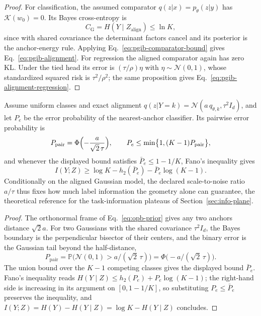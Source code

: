 \begin{proof}
For classification, the assumed comparator $q(z|x)=p_\theta(z|y)$ has
$\mathcal K(w_0)=0$. Its Bayes cross-entropy is
\begin{equation*}
C_{\mathrm G}=H(Y\mid Z_{\mathrm{align}})\le\ln K,
\end{equation*}
since with shared covariance the determinant factors cancel and its posterior is the
anchor-energy rule. Applying Eq.~\eqref{eq:pgib-comparator-bound} gives
Eq.~\eqref{eq:pgib-alignment}. For regression the aligned comparator again has zero
KL. Under the tied head its error is $(\tau/\rho)\eta$ with
$\eta\sim\mathcal N(0,1)$, whose standardized squared risk is $\tau^2/\rho^2$;
the same proposition gives Eq.~\eqref{eq:pgib-alignment-regression}.
\end{proof}

\begin{corollary}
\label{cor:opb-fano}
Assume uniform classes and exact alignment
$q(z|Y=k) = \mathcal{N}(a\,q_{\theta,k}, \tau^2 I_d)$, and let $P_e$ be the error
probability of the nearest-anchor classifier. Its pairwise error probability is
\begin{equation}
P_{\mathrm{pair}} = \Phi\Bigl(-\frac{a}{\sqrt{2}\,\tau}\Bigr),
\qquad
P_e \le \min\bigl\{1, (K-1)P_{\mathrm{pair}}\bigr\},
\end{equation}
and whenever the displayed bound satisfies $\bar P_e \le 1 - 1/K$, Fano's inequality
\citep{cover2006elements}
gives
\begin{equation}
I(Y;Z) \ge \log K - h_2(\bar P_e) - \bar P_e \log(K-1).
\end{equation}
Conditionally on the aligned Gaussian model, the declared scale-to-noise ratio
$a/\tau$ thus fixes how much label information the geometry alone can guarantee,
the theoretical reference for the task-information plateaus of
Section~\ref{sec:info-plane}.
\end{corollary}

\begin{proof}
The orthonormal frame of Eq.~\eqref{eq:opb-prior} gives any two anchors distance $\sqrt2a$. For
two Gaussians with the shared covariance $\tau^2I_d$, the Bayes boundary is the
perpendicular bisector of their centers, and the binary error is the Gaussian tail
beyond the half-distance,
\begin{equation*}
P_{\mathrm{pair}}
=\mathbb P\bigl(\mathcal N(0,1)>a/(\sqrt2\,\tau)\bigr)
=\Phi\bigl(-a/(\sqrt2\,\tau)\bigr).
\end{equation*}
The union bound over the $K-1$ competing classes gives the displayed bound
$\bar P_e$. Fano's inequality reads
$H(Y\mid Z)\le h_2(P_e)+P_e\log(K-1)$; the right-hand side is increasing in its
argument on $[0,1-1/K]$, so substituting $P_e\le\bar P_e$ preserves the
inequality, and $I(Y;Z)=H(Y)-H(Y\mid Z)=\log K-H(Y\mid Z)$ concludes.
\end{proof}

